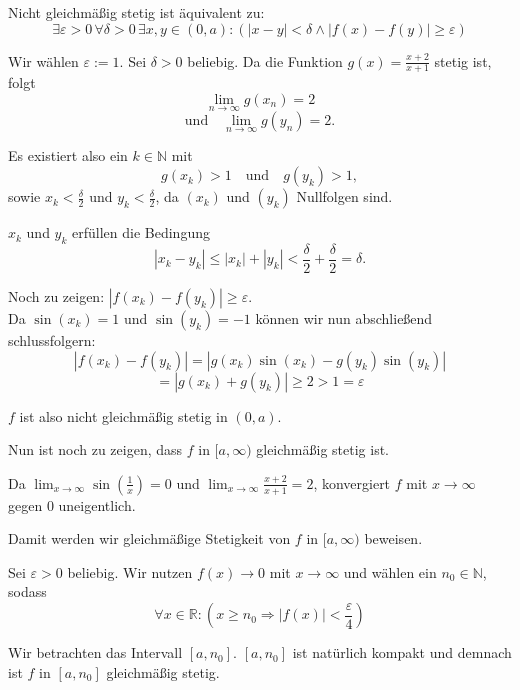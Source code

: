 \documentclass[a4paper,12pt]{article}
\begin{document}
\begin{enumerate}[label=\alph*)]
          Nicht gleichmäßig stetig ist äquivalent zu:
          \[
              \exists \varepsilon > 0 \, \forall \delta > 0 \, \exists x, y \in (0, a) : (|x - y| < \delta \land |f(x) - f(y)| \geq \varepsilon)
          \]

          Wir wählen $\varepsilon := 1$. Sei $\delta > 0$ beliebig.
          Da die Funktion $g(x) = \frac{x + 2}{x + 1}$ stetig ist, folgt
          \[
              \lim_{n \to \infty} g(x_n) = 2
          \]
          \[
              \text{und} \quad \lim_{n \to \infty} g(y_n) = 2.
          \]

          Es existiert also ein $k \in \mathbb{N}$ mit
          \[
              g(x_k) > 1 \quad \text{und} \quad g(y_k) > 1,
          \]
          sowie $x_k < \frac{\delta}{2}$ und $y_k < \frac{\delta}{2}$, da $(x_k)$ und $(y_k)$ Nullfolgen sind.

          $x_k$ und $y_k$ erfüllen die Bedingung
          \[
              |x_k - y_k| \leq |x_k| + |y_k| < \frac{\delta}{2} + \frac{\delta}{2} = \delta.
          \]
          
          \bigskip
          Noch zu zeigen: $|f(x_k) - f(y_k)| \geq \varepsilon$.
          \\ Da $\sin(x_k) = 1$ und $\sin(y_k) = -1$ können wir nun abschließend schlussfolgern:
          \[
              |f(x_k) - f(y_k)| = |g(x_k) \sin(x_k) - g(y_k) \sin(y_k)|
          \]
          \[
              = |g(x_k) + g(y_k)| \geq 2 > 1 = \varepsilon
          \]

          $f$ ist also nicht gleichmäßig stetig in $(0, a)$.

          \bigskip

          Nun ist noch zu zeigen, dass $f$ in $[a, \infty)$ gleichmäßig stetig ist.

          Da $\lim_{x \to \infty} \sin\left(\frac{1}{x}\right) = 0$ und $\lim_{x \to \infty} \frac{x+2}{x+1} = 2$, konvergiert $f$ mit $x \to \infty$ gegen $0$ uneigentlich.

          Damit werden wir gleichmäßige Stetigkeit von $f$ in $[a, \infty)$ beweisen.

          Sei $\varepsilon > 0$ beliebig. Wir nutzen $f(x) \to 0$ mit $x \to \infty$ und wählen ein $n_0 \in \mathbb{N}$, sodass
          \[
              \forall x \in \mathbb{R} : (x \geq n_0 \Rightarrow |f(x)| < \frac{\varepsilon}{4})
          \]

          Wir betrachten das Intervall $[a, n_0]$. $[a, n_0]$ ist natürlich kompakt und demnach ist $f$ in $[a, n_0]$ gleichmäßig stetig.


\end{enumerate}
\end{document}
